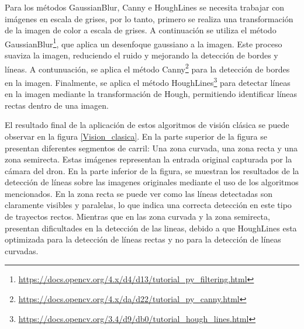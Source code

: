 Para los métodos GaussianBlur, Canny e HoughLines se necesita trabajar con imágenes en escala de grises, por lo tanto, primero se realiza una transformación de la imagen 
de color a escala de grises. A continuación se utiliza el método GaussianBlur\footnote{\url{https://docs.opencv.org/4.x/d4/d13/tutorial_py_filtering.html}}, que aplica un desenfoque 
gaussiano a la imagen. Este proceso suaviza la imagen, reduciendo el ruido y mejorando la detección de bordes y líneas. A contunuación, se aplica el método Canny\footnote{\url{https://docs.opencv.org/4.x/da/d22/tutorial_py_canny.html}} 
para la detección de bordes en la imagen. Finalmente, se aplica el método HoughLines\footnote{\url{https://docs.opencv.org/3.4/d9/db0/tutorial_hough_lines.html}} 
para detectar líneas en la imagen mediante la transformación de Hough, permitiendo identificar líneas rectas dentro de una imagen. \newline

El resultado final de la aplicación de estos algoritmos de visión clásica se puede observar en la figura \ref{Vision_clasica}. En la parte superior de la figura se presentan diferentes segmentos
de carril: Una zona curvada, una zona recta y una zona semirecta. Estas imágenes representan la entrada original capturada por la cámara del dron. En la parte inferior de la figura, 
se muestran los resultados de la detección de líneas sobre las imagenes originales mediante el uso de los algoritmos mencionados. En la zona recta se puede ver como las líneas
detectadas son claramente visibles y paralelas, lo que indica una correcta detección en este tipo de trayectos rectos. Mientras que en las zona curvada y la zona semirecta, presentan
dificultades en la detección de las lineas, debido a que HoughLines esta optimizada para la detección de líneas rectas y no para la detección de líneas curvadas. 

